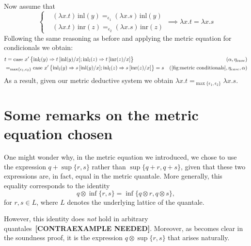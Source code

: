 Now assume that 
\[
\left\{
\begin{aligned}
&(\lambda x.t)\, \text{inl}(y) =_{\epsilon_1} (\lambda x.s)\, \text{inl}(y) \\
&(\lambda x.t)\, \text{inr}(z) =_{\epsilon_2}(\lambda x.s)\, \text{inr}(z)
\end{aligned}
\right.
\implies \lambda x.t = \lambda x.s
\]
Following the same reasoning as before and applying the metric equation for condicionals we obtain:
\begin{equation*}
\begin{split}
  &t =  \text{case } x'  
    \left\{ \begin{aligned}
    \inl_{\typeI}(y) \Rightarrow t\,[\text{inl}(y)/x] ;  
    \inl_{\typeI}(z) \Rightarrow t\,[\text{inr}(z)/x]
  \end{aligned}  \right\} & (\alpha,\eta_{case})\\
  &=_{\max \{\epsilon_1,\epsilon_2\}} \text{case } x'  
    \left\{ \begin{aligned}
    \inl_{\typeI}(y) \Rightarrow s\,[\text{inl}(y)/x] ;  
    \inl_{\typeI}(z) \Rightarrow s\,[\text{inr}(z)/x]
  \end{aligned}  \right\} = s & (\text{\autoref{fig:metric conditionals}},\eta_{case},\alpha)
\end{split}
\end{equation*}
As a result, given our metric deductive system we obtain $\lambda x.t =_{\max \{\epsilon_1,\epsilon_2\}} \lambda x.s$.



\section{Some remarks on the metric equation chosen}


One might wonder why, in the metric equation we introduced, we chose to use the expression \( q + \sup\{r, s\} \) rather than \( \sup\{q + r, q + s\} \), given that these two expressions are, in fact, equal in the metric quantale. More generally, this equality corresponds to the identity
\[
q \otimes \inf\{r, s\} = \inf\{q \otimes r, q \otimes s\},
\]
for \( r, s \in L \), where \( L \) denotes the underlying lattice of the quantale.

However, this identity does \emph{not} hold in arbitrary quantales~\textbf{[CONTRAEXAMPLE NEEDED]}. Moreover, as becomes clear in the soundness proof, it is the expression \( q \otimes \sup\{r, s\} \) that arises naturally. 